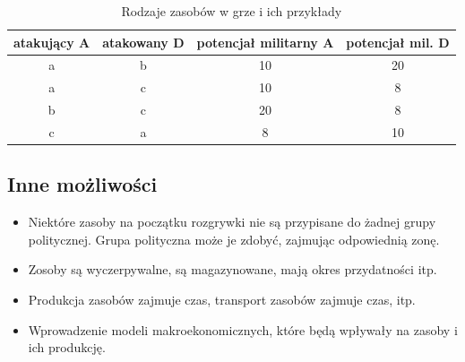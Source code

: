     \begin{table}[h!]
    \centering
    \begin{tabular}{|c|c|c|c|}
    \hline
    \textbf{atakujący A} & \textbf{atakowany D} & \textbf{potencjał militarny A}  & \textbf{potencjał mil. D}\\ \hline
    a & b & 10 & 20 \\ \hline
    a & c & 10 & 8 \\ \hline
    b & c & 20 & 8 \\ \hline
    c & a & 8 & 10 \\ \hline
    \end{tabular}
    \caption{Rodzaje zasobów w grze i ich przykłady}
    \label{tab:zasoby}
    \end{table}



\subsection*{Inne możliwości}

\begin{itemize}
    \item Niektóre zasoby na początku rozgrywki nie są przypisane do żadnej grupy politycznej. Grupa polityczna może je zdobyć, zajmując odpowiednią zonę.
    \item Zosoby są wyczerpywalne, są magazynowane, mają okres przydatności itp.
    \item Produkcja zasobów zajmuje czas, transport zasobów zajmuje czas, itp.
    \item Wprowadzenie modeli makroekonomicznych, które będą wpływały na zasoby i ich produkcję.


\end{itemize}